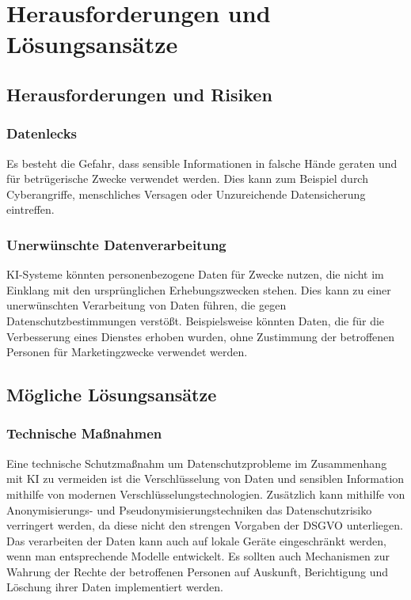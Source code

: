 \chapter{Herausforderungen und Lösungsansätze}

\section{Herausforderungen und Risiken}

\subsection{Datenlecks}

Es besteht die Gefahr, dass sensible Informationen in falsche Hände geraten und
für betrügerische Zwecke verwendet werden. Dies kann zum Beispiel durch
Cyberangriffe, menschliches Versagen oder Unzureichende Datensicherung
eintreffen.

\cite{digitalesinstitut2024}

\subsection{Unerwünschte Datenverarbeitung}

KI-Systeme könnten personenbezogene Daten für Zwecke nutzen, die nicht im
Einklang mit den ursprünglichen Erhebungszwecken stehen. Dies kann zu einer
unerwünschten Verarbeitung von Daten führen, die gegen Datenschutzbestimmungen
verstößt. Beispielsweise könnten Daten, die für die Verbesserung eines Dienstes
erhoben wurden, ohne Zustimmung der betroffenen Personen für Marketingzwecke
verwendet werden.

\cite{digitalesinstitut2024}

\section{Mögliche Lösungsansätze}

\subsection{Technische Maßnahmen}

Eine technische Schutzmaßnahm um Datenschutzprobleme im Zusammenhang mit KI zu
vermeiden ist die Verschlüsselung von Daten und sensiblen Information mithilfe
von modernen Verschlüsselungstechnologien. Zusätzlich kann mithilfe von
Anonymisierungs- und Pseudonymisierungstechniken das Datenschutzrisiko
verringert werden, da diese nicht den strengen Vorgaben der DSGVO unterliegen.
Das verarbeiten der Daten kann auch auf lokale Geräte eingeschränkt werden, wenn
man entsprechende Modelle entwickelt. Es sollten auch Mechanismen zur Wahrung
der Rechte der betroffenen Personen auf Auskunft, Berichtigung und Löschung
ihrer Daten implementiert werden.


